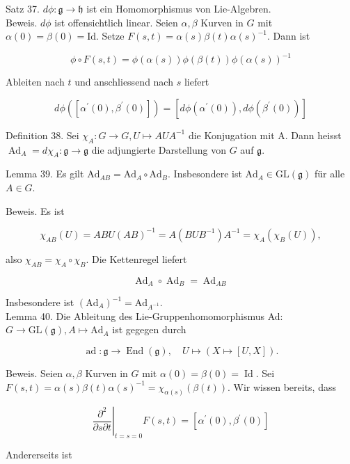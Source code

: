 \documentclass[10pt, letterpaper]{article}
\begin{document}
Satz 37. $d \phi: \mathfrak{g} \rightarrow \mathfrak{h}$ ist ein Homomorphismus von Lie-Algebren.\\
Beweis. $d \phi$ ist offensichtlich linear. Seien $\alpha, \beta$ Kurven in $G$ mit $\alpha(0)=\beta(0)=\mathrm{Id}$. Setze $F(s, t)=\alpha(s) \beta(t) \alpha(s)^{-1}$. Dann ist

$$
\phi \circ F(s, t)=\phi(\alpha(s)) \phi(\beta(t)) \phi(\alpha(s))^{-1}
$$

Ableiten nach $t$ und anschliessend nach $s$ liefert

$$
d \phi\left(\left[\alpha^{\prime}(0), \beta^{\prime}(0)\right]\right)=\left[d \phi\left(\alpha^{\prime}(0)\right), d \phi\left(\beta^{\prime}(0)\right)\right]
$$

Definition 38. Sei $\chi_{A}: G \rightarrow G, U \mapsto A U A^{-1}$ die Konjugation mit A. Dann heisst $\operatorname{Ad}_{A}=d \chi_{A}: \mathfrak{g} \rightarrow \mathfrak{g}$ die adjungierte Darstellung von $G$ auf $\mathfrak{g}$.

Lemma 39. Es gilt $\mathrm{Ad}_{A B}=\mathrm{Ad}_{A} \circ \mathrm{Ad}_{B}$. Insbesondere ist $\mathrm{Ad}_{A} \in \mathrm{GL}(\mathfrak{g})$ für alle $A \in G$.

Beweis. Es ist

$$
\chi_{A B}(U)=A B U(A B)^{-1}=A\left(B U B^{-1}\right) A^{-1}=\chi_{A}\left(\chi_{B}(U)\right),
$$

also $\chi_{A B}=\chi_{A} \circ \chi_{B}$. Die Kettenregel liefert

$$
\operatorname{Ad}_{A} \circ \operatorname{Ad}_{B}=\operatorname{Ad}_{A B}
$$

Insbesondere ist $\left(\mathrm{Ad}_{A}\right)^{-1}=\mathrm{Ad}_{A^{-1}}$.\\
Lemma 40. Die Ableitung des Lie-Gruppenhomomorphismus Ad: $G \rightarrow \mathrm{GL}(\mathfrak{g}), A \mapsto \mathrm{Ad}_{A}$ ist gegegen durch

$$
\operatorname{ad}: \mathfrak{g} \rightarrow \operatorname{End}(\mathfrak{g}), \quad U \mapsto(X \mapsto[U, X]) .
$$

Beweis. Seien $\alpha, \beta$ Kurven in $G$ mit $\alpha(0)=\beta(0)=\operatorname{Id}$. Sei $F(s, t)= \alpha(s) \beta(t) \alpha(s)^{-1}=\chi_{\alpha(s)}(\beta(t))$. Wir wissen bereits, dass

$$
\left.\frac{\partial^{2}}{\partial s \partial t}\right|_{t=s=0} F(s, t)=\left[\alpha^{\prime}(0), \beta^{\prime}(0)\right]
$$

Andererseits ist
\end{document}
